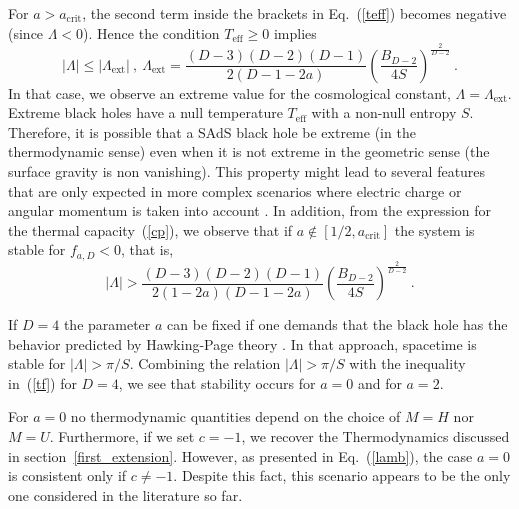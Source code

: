 \documentclass[prd,onecolumn,notitlepage,amsmath,nofootinbib,superscriptaddress,showpacs,showkeys]{revtex4-1}
\begin{document}
For $a>a_{\mathrm{crit}}$, the second term inside the brackets in
Eq.~(\ref{teff}) becomes negative (since $\Lambda<0$). Hence the
condition $T_{\mathrm{eff}}\geq0$ implies 
\begin{equation}
\left\vert \Lambda\right\vert \leq\left\vert \Lambda_{\mathrm{ext}}\right\vert ~,\ \Lambda_{\mathrm{ext}}=\frac{\left(D-3\right)\left(D-2\right)\left(D-1\right)}{2\left(D-1-2a\right)}\left(\frac{B_{D-2}}{4S}\right)^{\frac{2}{D-2}}~.\label{l-ext}
\end{equation}
In that case, we observe an extreme value for the cosmological constant,
$\Lambda=\Lambda_{\mathrm{ext}}$. Extreme black holes have a null
temperature $T_{\mathrm{eff}}$ with a non-null entropy $S$. Therefore,
it is possible that a SAdS black hole be extreme (in the thermodynamic
sense) even when it is not extreme in the geometric sense (the surface
gravity is non vanishing). This property might lead to several features
that are only expected in more complex scenarios where electric charge
or angular momentum is taken into account \cite{Dol1,KubMan2012,Deb16}.
%
In addition, from the expression for the thermal capacity~(\ref{cp}),
we observe that if $a\notin\left[1/2,a_{\mathrm{crit}}\right]$ the
system is stable for $f_{a,D}<0$, that is, 
\begin{equation}
\left|\Lambda\right|>\frac{\left(D-3\right)\left(D-2\right)\left(D-1\right)}{2\left(1-2a\right)\left(D-1-2a\right)}\left(\frac{B_{D-2}}{4S}\right)^{\frac{2}{D-2}}~.\label{tf}
\end{equation}

If $D=4$ the parameter $a$ can be fixed if one demands that the
black hole has the behavior predicted by Hawking-Page theory \cite{Haw1983}.
%
In that approach, spacetime is stable for $\left|\Lambda\right|>\pi/S$. Combining the relation $\left|\Lambda\right|>\pi/S$ with
the inequality in~(\ref{tf}) for $D=4$, we see that stability occurs for $a=0$ and for $a=2$.

For $a=0$ no thermodynamic quantities depend on the choice of $M=H$
nor $M=U$. Furthermore, if we set $c=-1$, we recover the Thermodynamics discussed in section~\ref{first_extension}. However, as 
presented
in Eq.~(\ref{lamb}), the case $a=0$ is consistent only if $c\neq-1$.
Despite this fact, this scenario appears to be the only one considered
in the literature so far.
\end{document}
